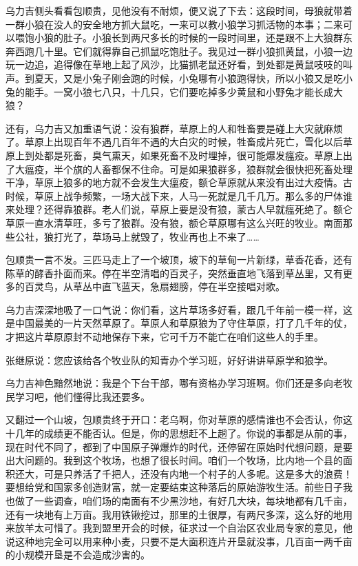 \par 乌力吉侧头看看包顺贵，见他没有不耐烦，便又说了下去：这段时间，母狼就带着一群小狼在没人的安全地方抓大鼠吃，一来可以教小狼学习抓活物的本事；二来可以喂饱小狼的肚子。小狼长到两尺多长的时候的一段时间里，还是跟不上大狼群东奔西跑几十里。它们就得靠自己抓鼠吃饱肚子。我见过一群小狼抓黄鼠，小狼一边玩一边追，追得像在草地上起了风沙，比猫抓老鼠还好看，到处都是黄鼠吱吱的叫声。到夏天，又是小兔子刚会跑的时候，小兔哪有小狼跑得快，所以小狼又是吃小兔的能手。一窝小狼七八只，十几只，它们要吃掉多少黄鼠和小野兔才能长成大狼？
\par 还有，乌力吉又加重语气说：没有狼群，草原上的人和牲畜要是碰上大灾就麻烦了。草原上出现百年不遇几百年不遇的大白灾的时候，牲畜成片死亡，雪化以后草原上到处都是死畜，臭气熏天，如果死畜不及时埋掉，很可能爆发瘟疫。草原上出了大瘟疫，半个旗的人畜都保不住命。可是如果狼群多，狼群就会很快把死畜处理干净，草原上狼多的地方就不会发生大瘟疫，额仑草原就从来没有出过大疫情。古时候，草原上战争频繁，一场大战下来，人马一死就是几千几万。那么多的尸体谁来处理？还得靠狼群。老人们说，草原上要是没有狼，蒙古人早就瘟死绝了。额仑草原一直水清草旺，多亏了狼群。没有狼，额仑草原哪有这么兴旺的牧业。南面那些公社，狼打光了，草场马上就毁了，牧业再也上不来了……
\par 包顺贵一言不发。三匹马走上了一个坡顶，坡下的草甸一片新绿，草香花香，还有陈草的酵香扑面而来。停在半空清唱的百灵子，突然垂直地飞落到草丛里，又有更多的百灵鸟，从草丛中直飞蓝天，急扇翅膀，停在半空接唱对歌。
\par 乌力吉深深地吸了一口气说：你们看，这片草场多好看，跟几千年前一模一样，这是中国最美的一片天然草原了。草原人和草原狼为了守住草原，打了几千年的仗，才把这片草原原封不动地保存下来，它可千万不能亡在咱们这些人的手里。
\par 张继原说：您应该给各个牧业队的知青办个学习班，好好讲讲草原学和狼学。
\par 乌力吉神色黯然地说：我是个下台干部，哪有资格办学习班啊。你们还是多向老牧民学习吧，他们懂得比我还要多。
\par 又翻过一个山坡，包顺贵终于开口：老乌啊，你对草原的感情谁也不会否认，你这十几年的成绩更不能否认。但是，你的思想赶不上趟了。你说的事都是从前的事，现在时代不同了，都到了中国原子弹爆炸的时代，还停留在原始时代想问题，是要出大问题的。我到这个牧场，也想了很长时间。咱们一个牧场，比内地一个县的面积还大，可是只养活了千把人，还没有内地一个村子的人多呢。这是多大的浪费！要想给党和国家多创造财富，就一定要结束这种落后的原始游牧生活。前些日子我也做了一些调查，咱们场的南面有不少黑沙地，有好几大块，每块地都有几千亩，还有一块地有上万亩。我用铁锹挖过，那里的土很厚，有两尺多深，这么好的地用来放羊太可惜了。我到盟里开会的时候，征求过一个自治区农业局专家的意见，他说这种地完全可以用来种小麦，只要不是大面积连片开垦就没事，几百亩一两千亩的小规模开垦是不会造成沙害的。
